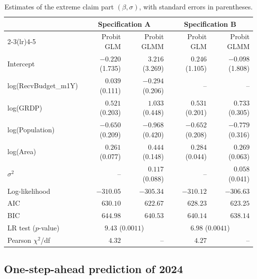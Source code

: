 \begin{table}[htbp]
\centering
\caption{Estimates of the extreme claim part \((\beta,\sigma)\), with
standard errors in parentheses.}
\label{tab.emp.M}
\small
\begin{tabular}{lrrrr}
\toprule
& \multicolumn{2}{c}{Specification A} & \multicolumn{2}{c}{Specification B}\\
\cmidrule(lr){2-3}\cmidrule(lr){4-5}
& Probit GLM & Probit GLMM & Probit GLM & Probit GLMM\\
\midrule
Intercept & \(-0.220\) (1.735) & \(3.216\) (3.269) & \(0.246\) (1.105) & \(-0.098\) (1.808)\\
log(RecvBudget\_m1Y) & \(0.039\) (0.111) & \(-0.294\) (0.206) & -- & --\\
log(GRDP) & \(0.521\) (0.203) & \(1.033\) (0.448) & \(0.531\) (0.201) & \(0.733\) (0.305)\\
log(Population) & \(-0.650\) (0.209) & \(-0.968\) (0.420) & \(-0.652\) (0.208) & \(-0.779\) (0.316)\\
log(Area) & \(0.261\) (0.077) & \(0.444\) (0.148) & \(0.284\) (0.044) & \(0.269\) (0.063)\\
\(\sigma^2\) & -- & \(0.117\) (0.088) & -- & \(0.058\) (0.041)\\
\midrule
Log-likelihood & \(-310.05\) & \(-305.34\) & \(-310.12\) & \(-306.63\)\\
AIC & \(630.10\) & \(622.67\) & \(628.23\) & \(623.25\)\\
BIC & \(644.98\) & \(640.53\) & \(640.14\) & \(638.14\)\\
LR test (\(p\)-value) & \multicolumn{2}{c}{\(9.43\) (\(0.0011\))} & \multicolumn{2}{c}{\(6.98\) (\(0.0041\))}\\
Pearson \(\chi^2\)/df & \(4.32\) & -- & \(4.27\) & --\\
\bottomrule
\end{tabular}
\end{table}

\subsection{One-step-ahead prediction of 2024}
\label{sec.emp.prediction}

